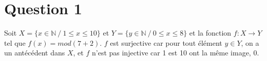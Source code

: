 \section*{Question 1}

Soit $X = \{ x \in \mathbb{N} \ / \ 1 \leq x \leq 10\}$ et   $Y = \{ y \in \mathbb{N} \ / \ 0 \leq x \leq 8\}$ et la fonction $f : X \rightarrow Y$ tel que $f(x) = mod (7 + 2)$. $f$ est surjective car pour tout élément $y \in Y$, on a un antécédent dans $X$, et $f$ n’est pas injective car 1 est 10 ont la même image, 0.
